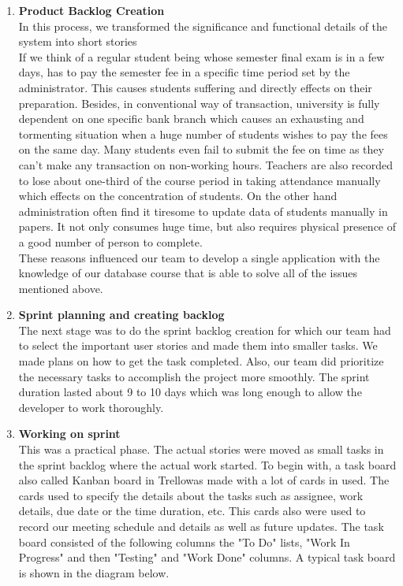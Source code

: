 \begin{enumerate}
\item \textbf{Product Backlog Creation}\\
In this process, we transformed the significance and functional details of the system into short stories\\ 
If we think of a regular student being whose semester final exam is in a few days, has to pay the semester fee in a specific time period set by the administrator. This causes students suffering and directly effects on their preparation. Besides, in conventional way of transaction, university is fully dependent on one specific bank branch which causes an exhausting and tormenting situation when a huge number of students wishes to pay the fees on the same day. Many students even fail to submit the fee on time as they can't make any transaction on non-working hours. Teachers are also recorded to lose about one-third of the course period in taking attendance manually which effects on the concentration of students. On the other hand administration often find it tiresome to update data of students manually in papers. It not only consumes huge time, but also requires physical presence of a good number of person to complete. \\
These reasons influenced our team to develop a single application with the knowledge of our database course that is able to solve all of the issues mentioned above.


\item \textbf{Sprint planning and creating backlog}\\

The next stage was to do the sprint backlog creation for which our team had to select the important user stories and made them into smaller tasks. We made plans on how to get the task completed. Also, our team did prioritize the necessary tasks to accomplish the project more smoothly. The sprint duration lasted about 9 to 10 days which was long enough to allow the developer to work thoroughly. 

\item \textbf{Working on sprint}\\

This was a practical phase. The actual stories were moved as small tasks in the sprint backlog where the actual work started. To begin with, a task board also called Kanban board in Trello\footnotemark was made with a lot of cards in used. The cards used to specify the details about the tasks such as assignee, work details, due date or the time duration, etc. This cards also were used to record our meeting schedule and details as well as future updates. The task board consisted of the following columns the "To Do" lists, "Work In Progress" and then "Testing" and "Work Done" columns. A typical task board is shown in the diagram below.
\\


\end{enumerate}
